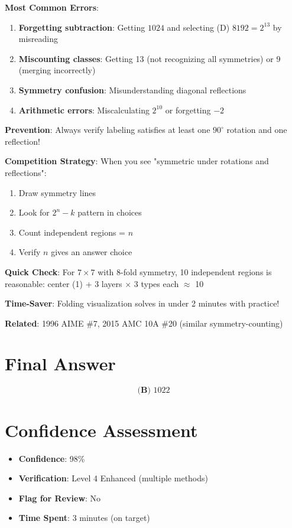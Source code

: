 \documentclass[]{article}
\begin{document}
\begin{warningbox}
\textbf{Most Common Errors}:

\begin{enumerate}
    \item \textbf{Forgetting subtraction}: Getting $1024$ and selecting (D) $8192 = 2^{13}$ by misreading
    \item \textbf{Miscounting classes}: Getting 13 (not recognizing all symmetries) or 9 (merging incorrectly)
    \item \textbf{Symmetry confusion}: Misunderstanding diagonal reflections
    \item \textbf{Arithmetic errors}: Miscalculating $2^{10}$ or forgetting $-2$
\end{enumerate}

\textbf{Prevention}: Always verify labeling satisfies at least one $90^{\circ}$ rotation and one reflection!
\end{warningbox}

\begin{tipbox}
\textbf{Competition Strategy}: When you see "symmetric under rotations and reflections":
\begin{enumerate}[nosep]
    \item Draw symmetry lines
    \item Look for $2^n - k$ pattern in choices
    \item Count independent regions = $n$
    \item Verify $n$ gives an answer choice
\end{enumerate}

\textbf{Quick Check}: For $7 \times 7$ with 8-fold symmetry, 10 independent regions is reasonable: center (1) + 3 layers $\times$ 3 types each $\approx$ 10

\textbf{Time-Saver}: Folding visualization solves in under 2 minutes with practice!

\textbf{Related}: 1996 AIME \#7, 2015 AMC 10A \#20 (similar symmetry-counting)
\end{tipbox}

\section*{Final Answer}
$$\boxed{\textbf{(B) } 1022}$$

\section*{Confidence Assessment}
\begin{itemize}[leftmargin=*]
    \item \textbf{Confidence}: 98\%
    \item \textbf{Verification}: Level 4 Enhanced (multiple methods)
    \item \textbf{Flag for Review}: No
    \item \textbf{Time Spent}: 3 minutes (on target)
\end{itemize}
\end{document}
